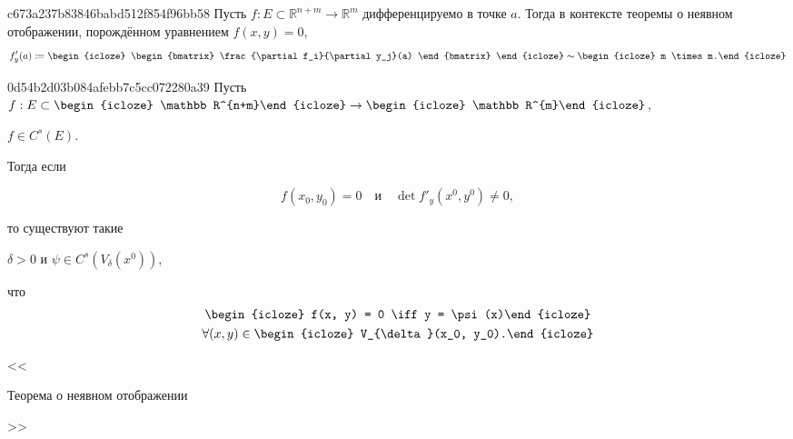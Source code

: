 \begin{note}{c673a237b83846babd512f854f96bb58}
    Пусть \({ f : E \subset \mathbb R^{n + m} \to \mathbb R^{m} }\) дифференцируемо в точке \({ a }\).
    Тогда в контексте теоремы о неявном отображении, порождённом уравнением \({ f(x, y) = 0 }\),
    \[
        f'_{y}(a) \coloneqq
        \begin{icloze}{1}
            \begin{bmatrix}
                \frac{\partial f_i}{\partial y_j}(a)
            \end{bmatrix}
        \end{icloze}
        \sim \begin{icloze}{2}m \times m.\end{icloze}
    \]
\end{note}

\begin{note}{0d54b2d03b084afebb7c5cc072280a39}
    Пусть \({ f : E \subset \begin{icloze}{4}\mathbb R^{n+m}\end{icloze} \to \begin{icloze}{4}\mathbb R^{m}\end{icloze} }\), \begin{icloze}{5}\({ f \in C^{s}(E) }\).\end{icloze}
    Тогда если
    \begin{icloze}{1}
        \[
            f(x_{0}, y_{0}) = 0 \quad \text{и} \quad \det f'_{y}(x^{0}, y^{0}) \neq 0,
        \]
    \end{icloze}
    то существуют такие \begin{icloze}{2}\({ \delta > 0 }\) и \({ \psi \in C^{s}(V_{\delta}(x^0)) }\),\end{icloze} что
    \[
        \begin{gathered}
            \begin{icloze}{3}f(x, y) = 0 \iff y = \psi(x)\end{icloze} \\
            \forall (x, y) \in \begin{icloze}{3}V_{\delta}(x_0, y_0).\end{icloze}
        \end{gathered}
    \]

    \begin{center}
        \tiny
        <<\begin{icloze}{6}Теорема о неявном отображении\end{icloze}>>
    \end{center}
\end{note}

